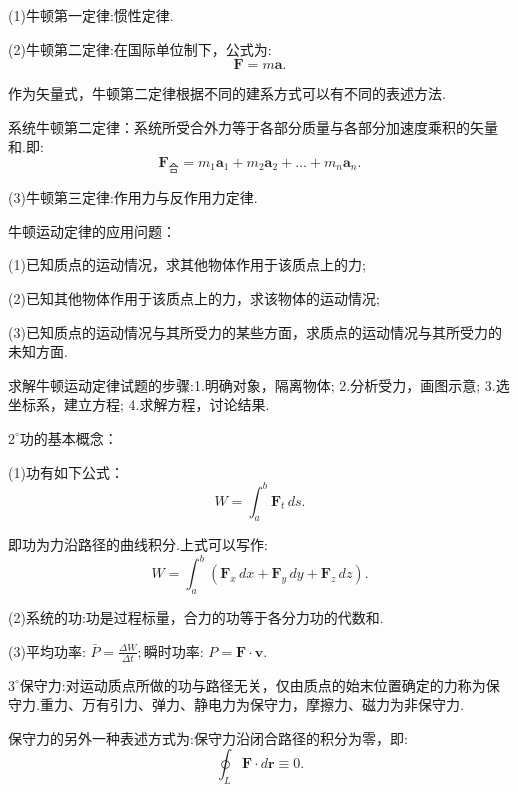 \documentclass[UTF8]{ctexart}
\begin{document}
	(1)牛顿第一定律:惯性定律.

	(2)牛顿第二定律:在国际单位制下，公式为:
	\begin{equation*}
		{\boldsymbol F}=m{\boldsymbol a}.
	\end{equation*}
	
	作为矢量式，牛顿第二定律根据不同的建系方式可以有不同的表述方法.

	系统牛顿第二定律：系统所受合外力等于各部分质量与各部分加速度乘积的矢量和.即:
	\begin{equation*}
		{\boldsymbol F}_{\text{合}}=m_1{\boldsymbol a}_1+m_2{\boldsymbol a}_2+\dots+m_n{\boldsymbol a}_n.
	\end{equation*}

	(3)牛顿第三定律:作用力与反作用力定律.

	牛顿运动定律的应用问题：

	(1)已知质点的运动情况，求其他物体作用于该质点上的力;

	(2)已知其他物体作用于该质点上的力，求该物体的运动情况;

	(3)已知质点的运动情况与其所受力的某些方面，求质点的运动情况与其所受力的未知方面.

	求解牛顿运动定律试题的步骤:1.明确对象，隔离物体; 2.分析受力，画图示意; 3.选坐标系，建立方程; 4.求解方程，讨论结果.

	$2^{\circ}$功的基本概念：

	(1)功有如下公式：
	\begin{equation*}
		W=\int_{a}^{b}{\boldsymbol F}_t \,ds. 
	\end{equation*}
		
	即功为力沿路径的曲线积分.上式可以写作:
	\begin{equation*}
		W=\int_{a}^{b}({\boldsymbol F}_x \,dx+{\boldsymbol F}_y\,dy+{\boldsymbol F}_z\,dz). 
	\end{equation*}

	(2)系统的功:功是过程标量，合力的功等于各分力功的代数和.

	(3)平均功率: $\bar{P}=\frac{\Delta W}{\Delta t}; $瞬时功率: $P={\boldsymbol F}·{\boldsymbol v}.$

	$3^{\circ}$保守力:对运动质点所做的功与路径无关，仅由质点的始末位置确定的力称为保守力.重力、万有引力、弹力、静电力为保守力，摩擦力、磁力为非保守力.

	保守力的另外一种表述方式为:保守力沿闭合路径的积分为零，即:
	\begin{equation*}
		\oint _L{\boldsymbol F}·d{\boldsymbol r}\equiv 0.
	\end{equation*}
\end{document}
